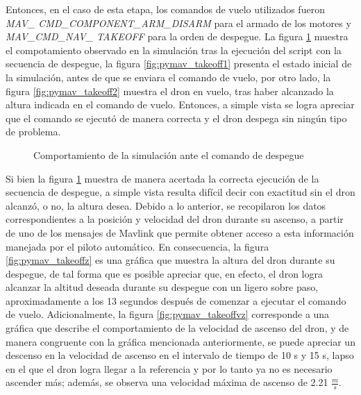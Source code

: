 Entonces, en el caso de esta etapa, los comandos de vuelo utilizados fueron \textit{MAV\_ CMD\_COMPONENT\_ARM\_DISARM} para el armado de los motores y \textit{MAV\_CMD\_NAV\_ TAKEOFF} para la orden de despegue. La figura \ref{fig:pymav_takeoff} muestra el compotamiento observado en la simulación tras la ejecución del script con la secuencia de despegue, la figura \ref{fig:pymav_takeoff1} presenta el estado inicial de la simulación, antes de que se enviara el comando de vuelo, por otro lado, la figura \ref{fig:pymav_takeoff2} muestra el dron en vuelo, tras haber alcanzado la altura indicada en el comando de vuelo. Entonces, a simple vista se logra apreciar que el comando se ejecutó de manera correcta y el dron despega sin ningún tipo de problema.  

\begin{figure}[ht]
    \centering
    \hfill
    \caption{Comportamiento de la simulación ante el comando de despegue}
    \label{fig:pymav_takeoff}
\end{figure}


Si bien la figura \ref{fig:pymav_takeoff} muestra de manera acertada la correcta ejecución de la secuencia de despegue, a simple vista resulta difícil decir con exactitud sin el dron alcanzó, o no, la altura desea. Debido a lo anterior, se recopilaron los datos correspondientes a la posición y velocidad del dron durante su ascenso, a partir de uno de los mensajes de Mavlink que permite obtener acceso a esta información manejada por el piloto automático. En consecuencia, la figura \ref{fig:pymav_takeoffz} es una gráfica que muestra la altura del dron durante su despegue, de tal forma que es posible apreciar que, en efecto, el dron logra alcanzar la altitud deseada durante su despegue con un ligero sobre paso, aproximadamente a los 13 segundos después de comenzar a ejecutar el comando de vuelo. Adicionalmente, la figura \ref{fig:pymav_takeoffvz} corresponde a una gráfica que describe el comportamiento de la velocidad de ascenso del dron, y de manera congruente con la gráfica mencionada anteriormente, se puede apreciar un descenso en la velocidad de ascenso en el intervalo de tiempo de 10 s y 15 s, lapso en el que el dron logra llegar a la referencia y por lo tanto ya no es necesario ascender más;  además, se observa una velocidad máxima de ascenso de 2.21 $\frac{m}{s}$.


